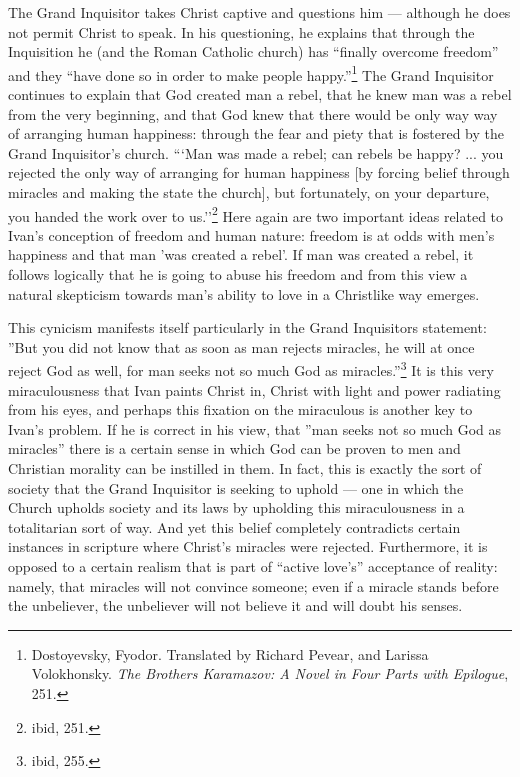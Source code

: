The Grand Inquisitor takes Christ captive and questions him --- although he does not permit Christ to speak. In his questioning, he explains that through the Inquisition he (and the Roman Catholic church) has ``finally overcome freedom'' and they ``have done so in order to make people happy.''\footnote{Dostoyevsky, Fyodor. Translated by Richard Pevear, and Larissa Volokhonsky. \emph{The Brothers Karamazov: A Novel in Four Parts with Epilogue}, 251.} The Grand Inquisitor continues to explain that God created man a rebel, that he knew man was a rebel from the very beginning, and that God knew that there would be only way way of arranging human happiness: through the fear and piety that is fostered by the Grand Inquisitor's church. ```Man was made a rebel; can rebels be happy? ... you rejected the only way of arranging for human happiness [by forcing belief through miracles and making the state the church], but fortunately, on your departure, you handed the work over to us.''\footnote{ibid, 251.} Here again are two important ideas related to Ivan's conception of freedom and human nature: freedom is at odds with men's happiness and that man 'was created a rebel'. If man was created a rebel, it follows logically that he is going to abuse his freedom and from this view a natural skepticism towards man's ability to love in a Christlike way emerges.

This cynicism manifests itself particularly in the Grand Inquisitors statement: ''But you did not know that as soon as man rejects miracles, he will at once reject God as well, for man seeks not so much God as miracles.''\footnote{ibid, 255.} It is this very miraculousness that Ivan paints Christ in, Christ with light and power radiating from his eyes, and perhaps this fixation on the miraculous is another key to Ivan's problem. If he is correct in his view, that ''man seeks not so much God as miracles'' there is a certain sense in which God can be proven to men and Christian morality can be instilled in them. In fact, this is exactly the sort of society that the Grand Inquisitor is seeking to uphold --- one in which the Church upholds society and its laws by upholding this miraculousness in a totalitarian sort of way. And yet this belief completely contradicts certain instances in scripture where Christ's miracles were rejected. Furthermore, it is opposed to a certain realism that is part of ``active love's'' acceptance of reality: namely, that miracles will not convince someone; even if a miracle stands before the unbeliever, the unbeliever will not believe it and will doubt his senses. 


